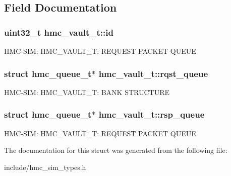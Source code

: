 \subsection{Field Documentation}
\hypertarget{structhmc__vault__t_a012fc49283e599603322364abcbaa00a}{
\subsubsection[{id}]{\setlength{\rightskip}{0pt plus 5cm}uint32\-\_\-t hmc\-\_\-vault\-\_\-t\-::id}}\label{structhmc__vault__t_a012fc49283e599603322364abcbaa00a}
H\-M\-C-\/\-S\-I\-M\-: H\-M\-C\-\_\-\-V\-A\-U\-L\-T\-\_\-\-T\-: R\-E\-Q\-U\-E\-S\-T P\-A\-C\-K\-E\-T Q\-U\-E\-U\-E \hypertarget{structhmc__vault__t_ae4e2005d2a68e9cb409bd2ba56fa77ab}{
\subsubsection[{rqst\-\_\-queue}]{\setlength{\rightskip}{0pt plus 5cm}struct {\bf hmc\-\_\-queue\-\_\-t}$\ast$ hmc\-\_\-vault\-\_\-t\-::rqst\-\_\-queue}}\label{structhmc__vault__t_ae4e2005d2a68e9cb409bd2ba56fa77ab}
H\-M\-C-\/\-S\-I\-M\-: H\-M\-C\-\_\-\-V\-A\-U\-L\-T\-\_\-\-T\-: B\-A\-N\-K S\-T\-R\-U\-C\-T\-U\-R\-E \hypertarget{structhmc__vault__t_a9bf96f2d49d0a73a779bc200df7e9ca1}{
\subsubsection[{rsp\-\_\-queue}]{\setlength{\rightskip}{0pt plus 5cm}struct {\bf hmc\-\_\-queue\-\_\-t}$\ast$ hmc\-\_\-vault\-\_\-t\-::rsp\-\_\-queue}}\label{structhmc__vault__t_a9bf96f2d49d0a73a779bc200df7e9ca1}
H\-M\-C-\/\-S\-I\-M\-: H\-M\-C\-\_\-\-V\-A\-U\-L\-T\-\_\-\-T\-: R\-E\-Q\-U\-E\-S\-T P\-A\-C\-K\-E\-T Q\-U\-E\-U\-E 

The documentation for this struct was generated from the following file\-:\begin{DoxyCompactItemize}
\item 
include/hmc\-\_\-sim\-\_\-types.\-h\end{DoxyCompactItemize}
